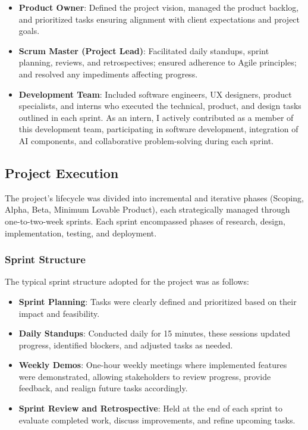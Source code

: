 \begin{itemize}
    \item \textbf{Product Owner}: Defined the project vision, managed the product backlog, and prioritized tasks ensuring alignment with client expectations and project goals.
    \item \textbf{Scrum Master (Project Lead)}: Facilitated daily standups, sprint planning, reviews, and retrospectives; ensured adherence to Agile principles; and resolved any impediments affecting progress.
    \item \textbf{Development Team}: Included software engineers, UX designers, product specialists, and interns who executed the technical, product, and design tasks outlined in each sprint. As an intern, I actively contributed as a member of this development team, participating in software development, integration of AI components, and collaborative problem-solving during each sprint.
\end{itemize}

\subsection{Project Execution}
The project's lifecycle was divided into incremental and iterative phases (Scoping, Alpha, Beta, Minimum Lovable Product), each strategically managed through one-to-two-week sprints. Each sprint encompassed phases of research, design, implementation, testing, and deployment.

\subsubsection{Sprint Structure}
The typical sprint structure adopted for the project was as follows:
\begin{itemize}
    \item \textbf{Sprint Planning}: Tasks were clearly defined and prioritized based on their impact and feasibility.
    \item \textbf{Daily Standups}: Conducted daily for 15 minutes, these sessions updated progress, identified blockers, and adjusted tasks as needed.
    \item \textbf{Weekly Demos}: One-hour weekly meetings where implemented features were demonstrated, allowing stakeholders to review progress, provide feedback, and realign future tasks accordingly.
    \item \textbf{Sprint Review and Retrospective}: Held at the end of each sprint to evaluate completed work, discuss improvements, and refine upcoming tasks.
\end{itemize}


